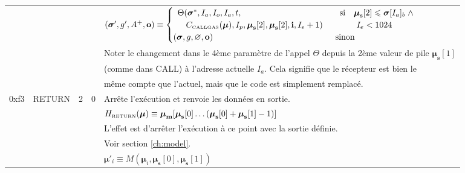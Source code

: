 \documentclass[9pt,oneside]{amsart}
\begin{document}
\begin{tabular*}{\columnwidth}[h]{rlrrl}
&&&& $(\boldsymbol{\sigma}', g', A^+, \mathbf{o}) \equiv \begin{cases}\begin{array}{l}\Theta(\boldsymbol{\sigma}^*, I_a, I_o, I_a, t,\\\quad C_{\text{\tiny CALLGAS}}(\boldsymbol{\mu}), I_p, \boldsymbol{\mu}_\mathbf{s}[2], \boldsymbol{\mu}_\mathbf{s}[2], \mathbf{i}, I_e + 1)\end{array} & \begin{array}{l}\text{si} \quad \boldsymbol{\mu}_\mathbf{s}[2] \leqslant \boldsymbol{\sigma}[I_a]_b \;\wedge\\ \quad\quad{}I_e < 1024\end{array} \\ (\boldsymbol{\sigma}, g, \varnothing, \mathbf{o}) & \text{sinon} \end{cases}$ \\
&&&& Noter le changement dans le 4ème paramètre de l'appel $\Theta$ depuis la 2ème valeur de pile $\boldsymbol{\mu}_\mathbf{s}[1]$\\
&&&& (comme dans {\small CALL}) à l'adresse actuelle $I_a$. Cela signifie que le récepteur est bien le\\
&&&& même compte que l'actuel, mais que le code est simplement remplacé.\\
\midrule
0xf3 & {\small RETURN} & 2 & 0 & Arrête l'exécution et renvoie les données en sortie. \\
&&&& $H_{\text{\tiny RETURN}}(\boldsymbol{\mu}) \equiv \boldsymbol{\mu}_\mathbf{m}[ \boldsymbol{\mu}_\mathbf{s}[0] \dots ( \boldsymbol{\mu}_\mathbf{s}[0] + \boldsymbol{\mu}_\mathbf{s}[1] - 1 ) ]$ \\
&&&& L'effet est d'arrêter l'exécution à ce point avec la sortie définie.\\
&&&& Voir section \ref{ch:model}. \\
&&&& $\boldsymbol{\mu}'_i \equiv M(\boldsymbol{\mu}_i, \boldsymbol{\mu}_\mathbf{s}[0], \boldsymbol{\mu}_\mathbf{s}[1])$ \\
\end{tabular*}
\end{document}
